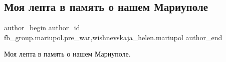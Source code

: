  
 
 
 
 

\subsection{Моя лепта в память о нашем Мариуполе}
\label{sec:09_01_2023.fb.fb_group.mariupol.pre_war.2.moya_lepta_v_pamyat_}
 
\ifcmt
 author_begin
   author_id fb_group.mariupol.pre_war,wishnevskaja_helen.mariupol
 author_end
\fi

Моя лепта в память о нашем Мариуполе.
